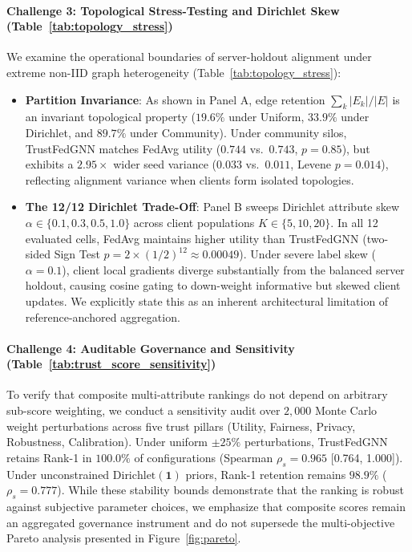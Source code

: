 \paragraph{Challenge 3: Topological Stress-Testing and Dirichlet Skew (Table~\ref{tab:topology_stress})}
We examine the operational boundaries of server-holdout alignment under extreme non-IID graph heterogeneity (Table~\ref{tab:topology_stress}):
\begin{itemize}[leftmargin=*]
    \item \textbf{Partition Invariance}: As shown in Panel A, edge retention $\sum_k |E_k| / |E|$ is an invariant topological property ($19.6\%$ under Uniform, $33.9\%$ under Dirichlet, and $89.7\%$ under Community). Under community silos, TrustFedGNN matches FedAvg utility ($0.744$ vs.\ $0.743$, $p=0.85$), but exhibits a $2.95\times$ wider seed variance ($0.033$ vs.\ $0.011$, Levene $p = 0.014$), reflecting alignment variance when clients form isolated topologies.
    \item \textbf{The 12/12 Dirichlet Trade-Off}: Panel B sweeps Dirichlet attribute skew $\alpha \in \{0.1, 0.3, 0.5, 1.0\}$ across client populations $K \in \{5, 10, 20\}$. In all 12 evaluated cells, FedAvg maintains higher utility than TrustFedGNN (two-sided Sign Test $p = 2 \times (1/2)^{12} \approx 0.00049$). Under severe label skew ($\alpha = 0.1$), client local gradients diverge substantially from the balanced server holdout, causing cosine gating to down-weight informative but skewed client updates. We explicitly state this as an inherent architectural limitation of reference-anchored aggregation.
\end{itemize}

\paragraph{Challenge 4: Auditable Governance and Sensitivity (Table~\ref{tab:trust_score_sensitivity})}
To verify that composite multi-attribute rankings do not depend on arbitrary sub-score weighting, we conduct a sensitivity audit over $2{,}000$ Monte Carlo weight perturbations across five trust pillars (Utility, Fairness, Privacy, Robustness, Calibration). Under uniform $\pm 25\%$ perturbations, TrustFedGNN retains Rank-1 in $100.0\%$ of configurations (Spearman $\rho_s = 0.965$ [0.764, 1.000]). Under unconstrained $\text{Dirichlet}(\mathbf{1})$ priors, Rank-1 retention remains $98.9\%$ ($\rho_s = 0.777$). While these stability bounds demonstrate that the ranking is robust against subjective parameter choices, we emphasize that composite scores remain an aggregated governance instrument and do not supersede the multi-objective Pareto analysis presented in Figure~\ref{fig:pareto}.

